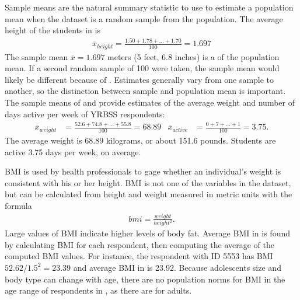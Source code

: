 \begin{spacing}{1.5}
Sample means are the natural summary statistic to use to estimate a population mean when the dataset is a random sample from the population.  The average height of the students in  is 
\begin{eqnarray*}
\overline{x}_{height} = \frac{1.50 + 1.78 + \dots + 1.70}{100} = 1.697
\end{eqnarray*}
The sample mean $\overline{x} = 1.697$ meters (5 feet, 6.8 inches) is a  of the population mean.  If a second random sample of 100 were taken, the sample mean would likely be different because of .  Estimates generally vary from one sample to another, so the distinction between sample and population mean is important.  The sample means of  and  provide estimates of the average weight and number of days active per week of YRBSS respondents:
\begin{align*}
\overline{x}_{weight} &= \frac{52.6 + 74.8 + \dots + 55.8}{100} = 68.89
&\overline{x}_{active} &= \frac{0 + 7 + \dots + 1}{100} = 3.75.
\end{align*}
The average weight is 68.89 kilograms, or about 151.6 pounds.  Students are active 3.75 days per week, on average.

BMI is used by health professionals to gage whether an individual's weight is consistent with his or her height. BMI is not one of the variables in the dataset, but can be calculated from height and weight measured in metric units with the formula 
\begin{align*}
	bmi = \frac{weight}{height{^2}}.
\end{align*}	
Large values of BMI indicate higher levels of body fat.	 Average BMI in  is found by calculating BMI for each respondent, then computing the average of the computed BMI values. For instance, the respondent with ID 5553 has BMI $52.62/1.5^2 = 23.39$  and average BMI in  is 23.92. Because adolescents size and body type can change with age, there are no population norms for BMI in the age range of respondents in , as there are for adults.



\end{spacing}
